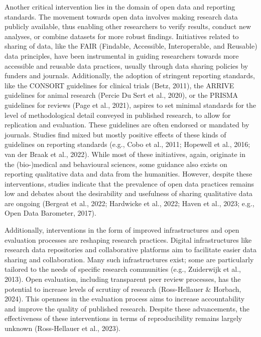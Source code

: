 \documentclass[authordate, meta]{jote-new-article}
\begin{document}
	Another critical intervention lies in the domain of open data and reporting standards. The movement towards open data involves making research data publicly available, thus enabling other researchers to verify results, conduct new analyses, or combine datasets for more robust findings. Initiatives related to sharing of data, like the FAIR (Findable, Accessible, Interoperable, and Reusable) data principles, have been instrumental in guiding researchers towards more accessible and reusable data practices, usually through data sharing policies by funders and journals. Additionally, the adoption of stringent reporting standards, like the CONSORT guidelines for clinical trials (Betz, 2011), the ARRIVE guidelines for animal research (Percie Du Sert et al., 2020), or the PRISMA guidelines for reviews (Page et al., 2021), aspires to set minimal standards for the level of methodological detail conveyed in published research, to allow for replication and evaluation. These guidelines are often endorsed or mandated by journals. Studies find mixed but mostly positive effects of these kinds of guidelines on reporting standards (e.g., Cobo et al., 2011; Hopewell et al., 2016; van der Braak et al., 2022). While most of these initiatives, again, originate in the (bio-)medical and behavioural sciences, some guidance also exists on reporting qualitative data and data from the humanities. However, despite these interventions, studies indicate that the prevalence of open data practices remains low and debates about the desirability and usefulness of sharing qualitative data are ongoing (Bergeat et al., 2022; Hardwicke et al., 2022; Haven et al., 2023; e.g., Open Data Barometer, 2017).



	Additionally, interventions in the form of improved infrastructures and open evaluation processes are reshaping research practices. Digital infrastructures like research data repositories and collaborative platforms aim to facilitate easier data sharing and collaboration. Many such infrastructures exist; some are particularly tailored to the needs of specific research communities (e.g., Zuiderwijk et al., 2013). Open evaluation, including transparent peer review processes, has the potential to increase levels of scrutiny of research (Ross-Hellauer \& Horbach, 2024). This openness in the evaluation process aims to increase accountability and improve the quality of published research. Despite these advancements, the effectiveness of these interventions in terms of reproducibility remains largely unknown (Ross-Hellauer et al., 2023).
\end{document}
